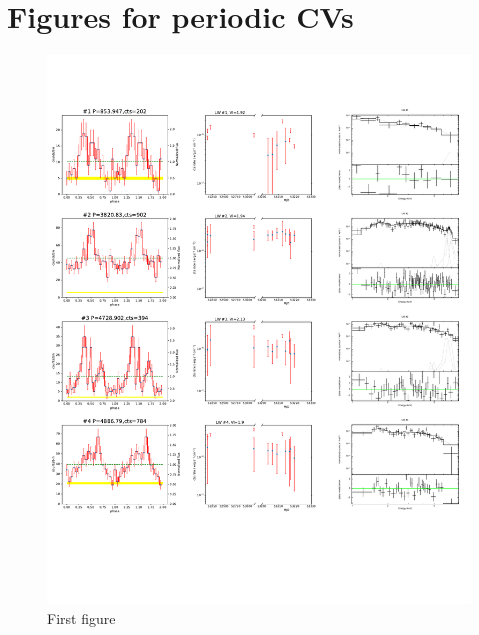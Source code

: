 \documentclass[twoside,twocolumn]{aastex63}
\begin{document}
\section{Figures for periodic CVs }
\begin{figure}[htbp]
    \centering
    \includegraphics[page=1,scale=0.90,trim=5 50 0 20,clip]{plot_figure_LW.pdf}
    \caption{First figure \label{fig:Figure_p}}
  \end{figure}
  
\end{document}
